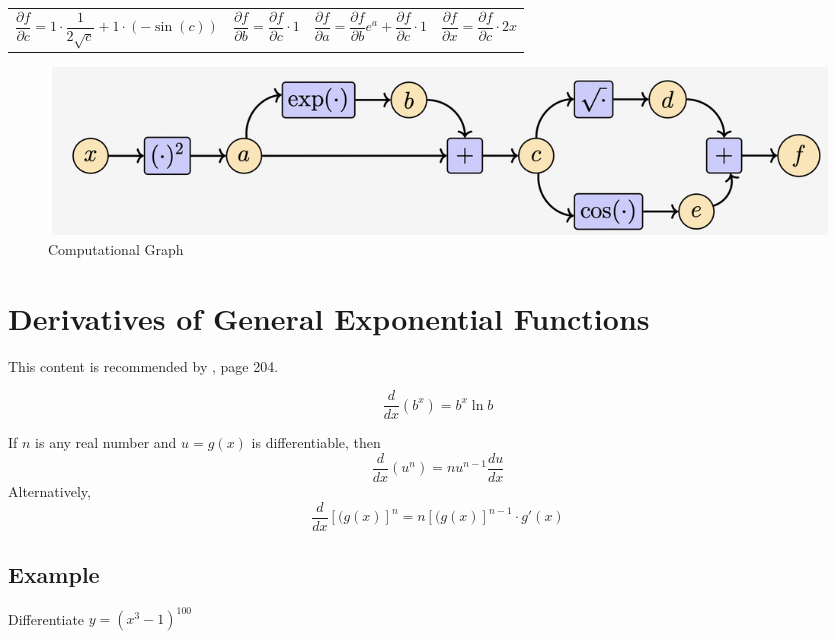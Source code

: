 \begin{tabularx}{\linewidth}{@{}XX@{}XX@{}}
    $$
        \frac{\partial f}{\partial c} = 1 \cdot \frac{1}{2\sqrt{c}} + 1 \cdot (- \sin(c))
    $$ 
    &
    $$
        \frac{\partial f}{\partial b} = \frac{\partial f}{\partial c} \cdot 1
    $$
    &
    $$
        \frac{\partial f}{\partial a} = \frac{\partial f}{\partial b}e^a + \frac{\partial f}{\partial c} \cdot 1
    $$
    &
    $$
        \frac{\partial f}{\partial x} = \frac{\partial f}{\partial c} \cdot 2x
    $$
\end{tabularx}

\begin{figure}[h]
    \centering
    \includegraphics[scale=0.4]{chapter001/figures/fig008}
    \caption{Computational Graph}
    \label{fig:Computational Graph}
\end{figure}


\section{Derivatives of General Exponential Functions}
This content is recommended by \cite{calculus}, page 204.
\begin{theorem}
\begin{equation}
    \label{eq:11}
    \frac{d}{dx}(b^x)=b^x\ln b
\end{equation}    
\end{theorem}

\begin{theorem}
If $n$ is any real number and $u=g(x)$ is differentiable, then
\begin{equation}
    \label{eq:12}
     \frac{d}{dx}(u^n)=nu^{n-1}\frac{du}{dx}
\end{equation}
Alternatively,
\begin{equation}
    \label{eq:12}
     \frac{d}{dx}[(g(x)]^n=n[(g(x)]^{n-1} \cdot g'(x)
\end{equation}    
\end{theorem}

\subsection{Example}
Differentiate $y=(x^3 - 1)^{100}$
